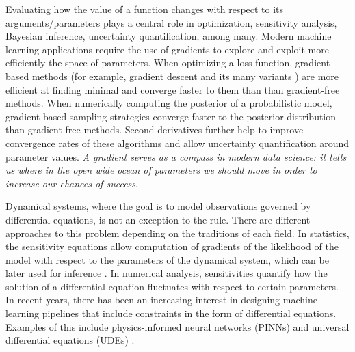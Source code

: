 

Evaluating how the value of a function changes with respect to its arguments/parameters plays a central role in optimization, sensitivity analysis, Bayesian inference, uncertainty quantification, among many. 
Modern machine learning applications require the use of gradients to explore and exploit more efficiently the space of parameters. 
When optimizing a loss function, gradient-based methods (for example, gradient descent and its many variants \cite{ruder2016overview-gradient-descent}) are more efficient at finding minimal and converge faster to them than than gradient-free methods.
When numerically computing the posterior of a probabilistic model, gradient-based sampling strategies converge faster to the posterior distribution than gradient-free methods. 
Second derivatives further help to improve convergence rates of these algorithms and allow uncertainty quantification around parameter values.
\textit{A gradient serves as a compass in modern data science: it tells us where in the open wide ocean of parameters we should move in order to increase our chances of success}.  

Dynamical systems, where the goal is to model observations governed by differential equations, is not an exception to the rule.
There are different approaches to this problem depending on the traditions of each field. 
In statistics, the sensitivity equations allow computation of gradients of the likelihood of the model with respect to the parameters of the dynamical system, which can be later used for inference \cite{ramsay2017dynamic}. 
In numerical analysis, sensitivities quantify how the solution of a differential equation fluctuates with respect to certain parameters. 
In recent years, there has been an increasing interest in designing machine learning pipelines that include constraints in the form of differential equations. 
Examples of this include physics-informed neural networks (PINNs) \cite{PINNs_2019} and universal differential equations (UDEs) \cite{rackauckas2020universal}.  

